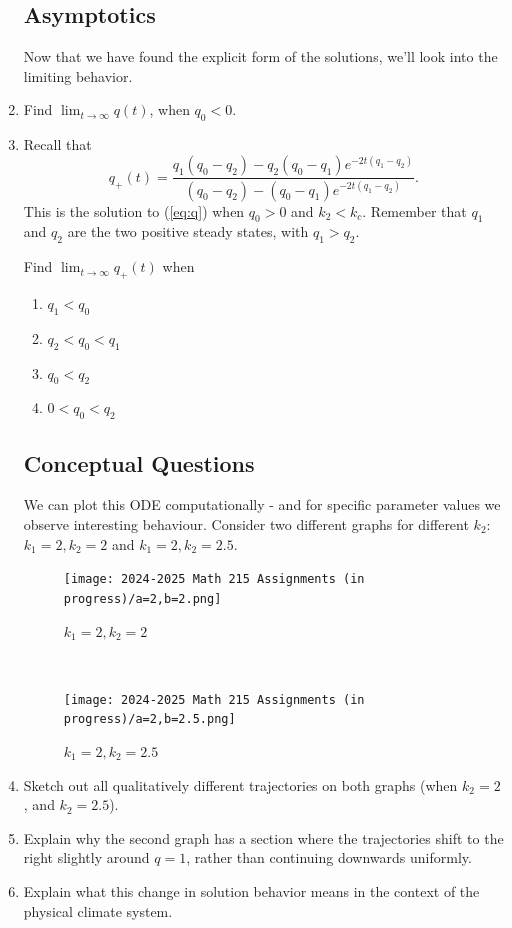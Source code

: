 \documentclass[10pt, letterpaper, answer]{exam}
\begin{document}
\begin{enumerate}
\subsection{Asymptotics}
Now that we have found the explicit form of the solutions, we'll look into the limiting behavior. 
\item Find $\displaystyle \lim_{t\to \infty} q(t)$, when $q_0<0$.

\item 
Recall that 
\begin{equation}
    q_+(t) = \dfrac{q_1(q_0 - q_2) - q_2(q_0 - q_1)e^{-2t(q_1-q_2)}}{(q_0 - q_2) - (q_0 - q_1)e^{-2t(q_1-q_2)}}.
\end{equation}
This is the solution to (\ref{eq:q}) when $q_0>0$ and $k_2<k_c$. Remember that $q_1$ and $q_2$ are the two positive steady states, with $q_1>q_2$.

Find $\displaystyle \lim_{t\to\infty}q_+(t)$ when 
\begin{enumerate}
\item $q_1<q_0$

\item $q_2<q_0<q_1$

\item $q_0<q_2$

\item $0<q_0<q_2$

\end{enumerate}


    
\subsection{Conceptual Questions}
We can plot this ODE computationally - and for specific parameter values we observe interesting behaviour. Consider two different graphs for different $k_2$: $k_1 = 2, k_2 = 2$ and $k_1 = 2, k_2 = 2.5$. \\
\begin{figure} [h]
    \centering    \texttt{[image: 2024-2025 Math 215 Assignments (in progress)/a=2,b=2.png]}
    \caption{$k_1 = 2, k_2 = 2$}
    \label{fig:enter-label}
\end{figure} \\
\begin{figure} [h]
    \centering    \texttt{[image: 2024-2025 Math 215 Assignments (in progress)/a=2,b=2.5.png]}
    \caption{$k_1 = 2, k_2 = 2.5$}
    \label{fig:enter-label}
\end{figure} \newpage
\item Sketch out all qualitatively different trajectories on both graphs (when $k_2 = 2$, and $k_2 = 2.5$). 
\item Explain why the second graph has a section where the trajectories shift to the right slightly around $q=1$, rather than continuing downwards uniformly.

\item Explain what this change in solution behavior means in the context of the physical climate system.

\end{enumerate}
\end{document}
